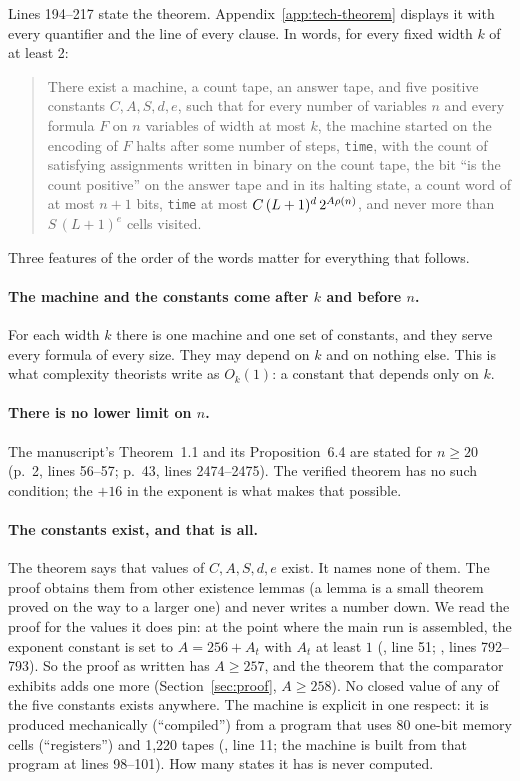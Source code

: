 Lines 194--217 state the theorem. Appendix~\ref{app:tech-theorem}
displays it with every quantifier and the line of every clause. In
words, for every fixed width $k$ of at least 2:

\begin{quote}
There exist a machine, a count tape, an answer tape, and five positive
constants $C, A, S, d, e$, such that for every number of variables $n$
and every formula $F$ on $n$ variables of width at most $k$, the
machine started on the encoding of $F$ halts after some number of steps,
\texttt{time}, with the count of satisfying assignments written in
binary on the count tape, the bit ``is the count positive'' on the
answer tape and in its halting state, a count word of at most $n + 1$
bits, \texttt{time} at most $C\,(L+1)^d\,2^{A\rho(n)}$, and never more
than $S\,(L+1)^e$ cells visited.
\end{quote}

Three features of the order of the words matter for everything that
follows.

\paragraph{The machine and the constants come after $k$ and before $n$.}
For each width $k$ there is one machine and one set of constants, and
they serve every formula of every size. They may depend on $k$ and on
nothing else. This is what complexity theorists write as $O_k(1)$: a
constant that depends only on $k$.

\paragraph{There is no lower limit on $n$.}
The manuscript's Theorem~1.1 and its Proposition~6.4 are stated for
$n \ge 20$ (p.~2, lines 56--57; p.~43, lines 2474--2475). The verified
theorem has no such condition; the $+16$ in the exponent is what makes
that possible.

\paragraph{The constants exist, and that is all.}
The theorem says that values of $C, A, S, d, e$ exist. It names none
of them. The proof obtains them from other existence lemmas (a lemma is a small theorem proved on the way to a larger one) and never writes a number down. We read the proof for the values it does pin:
at the point where the main run is assembled, the exponent constant is
set to $A = 256 + A_t$ with $A_t$ at least $1$
(, line 51;
, lines 792--793). So
the proof as written has $A \ge 257$, and the theorem that the
comparator exhibits adds one more
(Section~\ref{sec:proof}, $A \ge 258$). No closed value of any of the
five constants exists anywhere. The machine is explicit in one respect:
it is produced mechanically (``compiled'') from a program that uses 80 one-bit memory cells (``registers'') and 1,220 tapes
(, line 11; the machine is built from
that program at lines 98--101). How many states it
has is never computed.

